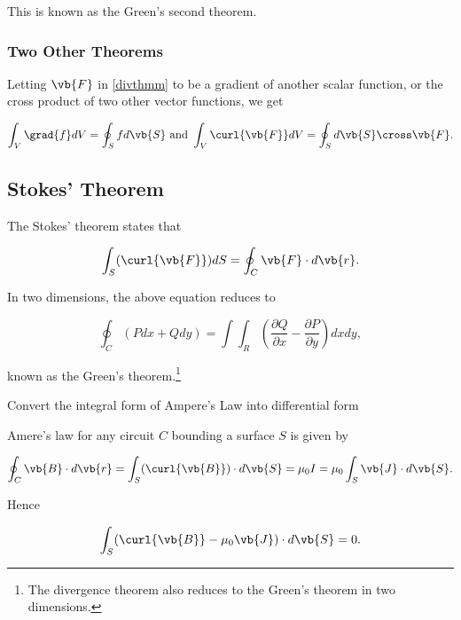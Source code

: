 \documentclass[english,a4paper,12pt]{report}
\begin{document}
This is known as the Green's second theorem.

\subsubsection{Two Other Theorems}

Letting \(\vb{F} \) in \cref{divthmm} to be a gradient of another scalar function, or the cross product of two other vector functions, we get 

\begin{equation}
	\int_{V}^{} \grad{f} dV = \oint_{S} fd\vb{S} \text { and } \int_{V}^{} \curl{\vb{F} } dV = \oint_{S} d\vb{S} \cross \vb{F} .     
\end{equation}

\subsection{Stokes' Theorem}
The Stokes' theorem states that 

\begin{equation} \label{stothmm} 
	\int_{S}^{} (\curl{\vb{F} } ) dS = \oint_{C} \vb{F} \cdot d\vb{r} .
\end{equation}

In two dimensions, the above equation reduces to 

\begin{equation}
	\oint_{C} (Pdx + Qdy) = \int \int_{R}^{} \left( \frac{\partial Q}{\partial x} - \frac{\partial P}{\partial y}  \right) dxdy,
\end{equation}

known as the Green's theorem.\footnote{The divergence theorem also reduces to the Green's theorem in two dimensions.} 

{Convert the integral form of Ampere's Law into differential form}
{Amere's law for any circuit \(C\) bounding a surface \(S\) is given by 

\begin{equation}
	\oint_{C} \vb{B} \cdot d\vb{r} = \int_{S}^{} (\curl{\vb{B} } ) \cdot d\vb{S} =  \mu _{0} I = \mu _{0}  \int_{S}^{} \vb{J} \cdot d\vb{S} .  
\end{equation}

Hence 

\begin{equation}
	\int_{S}^{} (\curl{\vb{B} } - \mu _{0} \vb{J}  ) \cdot d\vb{S} = 0.
\end{equation}
}
\end{document}
